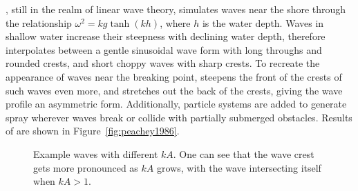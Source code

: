 \citet{Peachey:1986}, still in the realm of linear
wave theory, simulates waves near the shore through the relationship
$\omega^2=kg\tanh (kh)$, where $h$ is the water depth. Waves in shallow
water increase their steepness with declining water depth, \citeauthor{Peachey:1986}
therefore interpolates between a gentle sinusoidal wave form with long throughs
and rounded crests, and short choppy waves with sharp crests. To recreate the
appearance of waves near the breaking point, \citeauthor{Peachey:1986} steepens the front
of the crests of such waves even more, and stretches out the back of the crests,
giving the wave profile an asymmetric form.
Additionally, particle systems are added to generate spray wherever waves break or
collide with partially submerged obstacles.
Results of \citet{Peachey:1986} are shown in Figure~\ref{fig:peachey1986}.
%
\begin{figure}[p]
\caption[Example instances of Gerstner waves.]{
Example waves with different $kA$. One can see that the wave crest gets more pronounced as $kA$ grows,
with the wave intersecting itself when $kA > 1$.}
\label{fig:trochoid:crests}
\end{figure}
%
%
